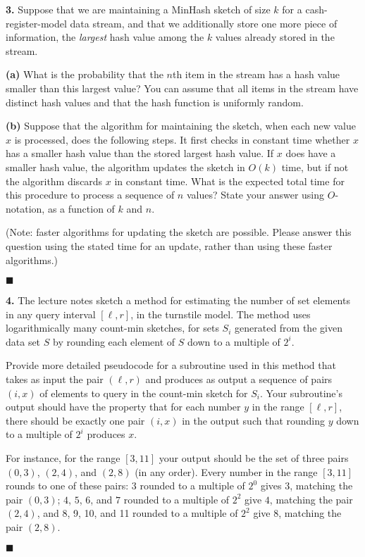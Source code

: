 \documentclass{article}
\newenvironment{problem}{%
  \bigskip\noindent\begin{boxedminipage}{\columnwidth}%
}{\end{boxedminipage}}
\newenvironment{solution}{%
  \begin{trivlist}\item[]%
}{%
  \mbox{}\penalty10000\hfill\ensuremath{\scriptscriptstyle\blacksquare}%
  \end{trivlist}%
}
\begin{document}
\begin{problem}
\textbf{3.} Suppose that we are maintaining a MinHash sketch of size $k$ for a cash-register-model data stream, and that we additionally store one more piece of information, the \emph{largest} hash value among the $k$ values already stored in the stream.

\smallskip\textbf{(a)} What is the probability that the $n$th item in the stream has a hash value smaller than this largest value? You can assume that all items in the stream have distinct hash values and that the hash function is uniformly random.

\smallskip\textbf{(b)} Suppose that the algorithm for maintaining the sketch, when each new value $x$ is processed, does the following steps. It first checks in constant time whether $x$ has a smaller hash value than the stored largest hash value. If $x$ does have a smaller hash value, the algorithm updates the sketch in $O(k)$ time, but if not the algorithm discards $x$ in constant time. What is the expected total time for this procedure to process a sequence of $n$ values? State your answer using $O$-notation, as a function of $k$ and $n$.

\smallskip
(Note: faster algorithms for updating the sketch are possible. Please answer this question using the stated time for an update, rather than using these faster algorithms.)
\end{problem}

\begin{solution}
\end{solution}

\begin{problem}
\textbf{4.}  The lecture notes sketch a method for estimating the number of set elements in any query interval $[\ell,r]$, in the turnstile model. The method uses logarithmically many count-min sketches, for sets $S_i$ generated from the given data set $S$ by rounding each element of $S$ down to a multiple of $2^i$.

\smallskip
Provide more detailed pseudocode for a subroutine used in this method that takes as input the pair $(\ell,r)$ and produces as output a sequence of pairs $(i,x)$ of elements to query in the count-min sketch for $S_i$. Your subroutine's output should have the property that for each number $y$ in the range $[\ell,r]$, there should be exactly one pair $(i,x)$ in the output such that rounding $y$ down to a multiple of $2^i$ produces $x$.

\smallskip
For instance, for the range $[3,11]$ your output should be the set of three pairs $(0,3)$, $(2,4)$, and $(2,8)$ (in any order). Every number in the range $[3,11]$ rounds to one of these pairs: $3$ rounded to a multiple of $2^0$ gives $3$, matching the pair $(0,3)$; $4$, $5$, $6$, and $7$ rounded to a multiple of $2^2$ give $4$, matching the pair $(2,4)$, and 8, 9, 10, and 11 rounded to a multiple of $2^2$ give 8, matching the pair $(2,8)$.
\end{problem}

\begin{solution}
\end{solution}
\end{document}
